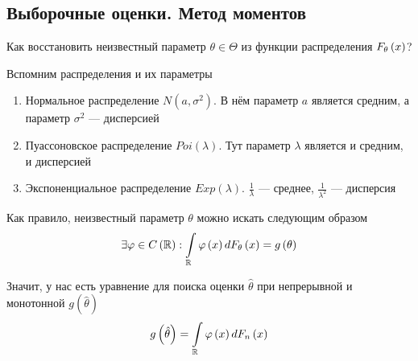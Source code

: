 \subsection{Выборочные оценки. Метод моментов}
Как восстановить неизвестный параметр $\theta\in\Theta$
из функции распределения $F_{\theta}\left(x\right)$?

Вспомним распределения и их параметры
\begin{enumerate}
    \item Нормальное распределение $N\left(a,\sigma^2\right)$.
        В нём параметр $a$ является средним,
        а параметр $\sigma^2$ --- дисперсией
    \item Пуассоновское распределение $Poi\left(\lambda\right)$.
        Тут параметр $\lambda$ является и средним, и дисперсией
    \item Экспоненциальное распределение $Exp\left(\lambda\right)$.
        $\frac{1}{\lambda}$ --- среднее,
        $\frac{1}{\lambda^2}$ --- дисперсия
\end{enumerate}

Как правило, неизвестный параметр $\theta$ можно искать следующим образом
$$\exists\varphi\in C\left(\mathbb{R}\right):
    \int\limits_{\mathbb{R}}\varphi\left(x\right)dF_{\theta}\left(x\right)
        =g\left(\theta\right)$$

Значит, у нас есть уравнение для поиска оценки $\hat{\theta}$
при непрерывной и монотонной $g\left( \hat{\theta} \right)$
\begin{align*}
g\left(\hat{\theta}\right)
    =\int\limits_{\mathbb{R}}\varphi\left(x\right)dF_n\left(x\right)
\end{align*}

